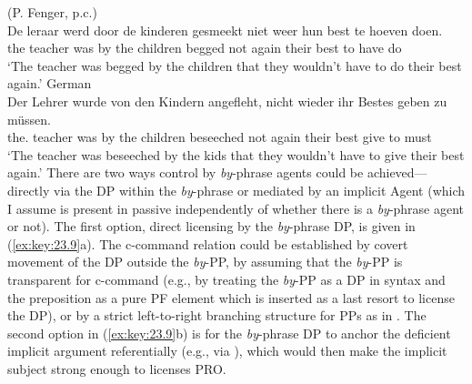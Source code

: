 \documentclass[output=paper]{langsci/langscibook}
\begin{document}
\ea\label{ex:key:23.8}
	\ea\label{ex:key:23.8a}  (P. Fenger, p.c.)\\
    \sn
		\gll De leraar  werd  door de kinderen  gesmeekt niet  weer  hun best  te hoeven  doen.\\
			the teacher  was  by the children  begged not  again  their best  to have  do\\
		\glt ‘The teacher was begged by the children that they wouldn’t have to do their best again.’
	\ex\label{ex:key:23.8b} German\\
    \sn
		\gll Der Lehrer  wurde  von den Kindern  angefleht, nicht  wieder  ihr Bestes  geben  zu müssen.\\
			the.\Nom{} teacher  was  by the children  beseeched not  again  their best  give  to must\\
		\glt ‘The teacher was beseeched by the kids that they wouldn’t have to give their best again.’
	\z
\z
%
There are two ways control by \emph{by}-phrase agents could be
achieved—directly via the DP within the \emph{by}-phrase or mediated by an
implicit Agent (which I assume is present in passive independently of whether
there is a \emph{by}-phrase agent or not). The first option, direct licensing
by the \emph{by}-phrase DP, is given in (\ref{ex:key:23.9}a). The c-command relation could be
established by covert movement of the DP outside the \emph{by}-PP, by
assuming that the \emph{by}-PP is transparent for c-command (e.g., by
treating the \emph{by}-PP as a DP in syntax and the preposition as a pure PF
element which is inserted as a last resort to license the DP), or by a strict
left-to-right branching structure for PPs as in \citet{Pesetsky1995}. The
second option in (\ref{ex:key:23.9}b) is for the \emph{by}-phrase DP to anchor the deficient
implicit argument referentially (e.g., via ), which would then make the
implicit subject strong enough to licenses PRO.\newpage
\end{document}
